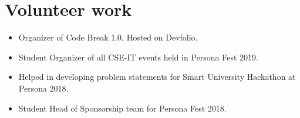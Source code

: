 \documentclass[letterpaper,11pt]{article}
\newcommand{\resumeItem}[2]{
  \item\small{
    \textbf{#1}{ #2 \vspace{-2pt}}
  }
}
\newcommand{\resumeSubItem}[2]{\resumeItem{#1}{#2}\vspace{-4pt}}
\newcommand{\resumeSubHeadingListStart}{\begin{itemize}[leftmargin=*]}
\newcommand{\resumeSubHeadingListEnd}{\end{itemize}}
\begin{document}
\section{Volunteer work}
  \resumeSubHeadingListStart
    \resumeSubItem{}{Organizer of Code Break 1.0, Hosted on Devfolio.}
    \resumeSubItem{}{Student Organizer of all CSE-IT events held in Persona Fest 2019.}
    \resumeSubItem{}{Helped in developing problem statements for Smart University Hackathon at Persona 2018.}
    \resumeSubItem{}{Student Head of Sponsorship team for Persona Fest 2018.}
  \resumeSubHeadingListEnd



\end{document}
